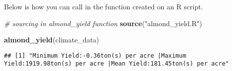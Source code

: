 \documentclass[
]{article}
\newenvironment{Shaded}{\begin{snugshade}}{\end{snugshade}}
\newcommand{\CommentTok}[1]{\textcolor[rgb]{0.56,0.35,0.01}{\textit{#1}}}
\newcommand{\FunctionTok}[1]{\textcolor[rgb]{0.13,0.29,0.53}{\textbf{#1}}}
\newcommand{\NormalTok}[1]{#1}
\newcommand{\StringTok}[1]{\textcolor[rgb]{0.31,0.60,0.02}{#1}}
\begin{document}
Below is how you can call in the function created on an R script.

\begin{Shaded}
\begin{Highlighting}[]
\CommentTok{\# sourcing in almond\_yield function}
\FunctionTok{source}\NormalTok{(}\StringTok{"almond\_yield.R"}\NormalTok{)}

\FunctionTok{almond\_yield}\NormalTok{(climate\_data)}
\end{Highlighting}
\end{Shaded}

\begin{verbatim}
## [1] "Minimum Yield:-0.36ton(s) per acre |Maximum Yield:1919.98ton(s) per acre |Mean Yield:181.45ton(s) per acre"
\end{verbatim}
\end{document}

